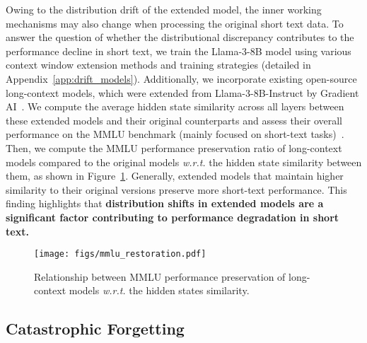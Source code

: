 Owing to the distribution drift of the extended model, the inner working mechanisms may also change when processing the original short text data. 
To answer the question of whether the distributional discrepancy contributes to the performance decline in short text, we train the Llama-3-8B model using various context window extension methods and training strategies (detailed in Appendix~\ref{app:drift_models}). Additionally, we incorporate existing open-source long-context models, which were extended from Llama-3-8B-Instruct by Gradient AI~\cite{gradient-hf-2024-longcontextllama3}. We compute the average hidden state similarity across all layers between these extended models and their original counterparts and assess their overall performance on the MMLU benchmark (mainly focused on short-text tasks)~\cite{Hendrycks-iclr-2021-mmlu}. Then, we compute the MMLU performance preservation ratio of long-context models compared to the original models \emph{w.r.t.} the hidden state similarity between them, as shown in Figure~\ref{fig:mmlu_restoration}. Generally, extended models that maintain higher similarity to their original versions preserve more short-text performance. This finding highlights that \textbf{distribution shifts in extended models are a significant factor contributing to performance degradation in short text.}

%
\begin{figure}[htb]
   \centering
    \texttt{[image: figs/mmlu\_restoration.pdf]}
    \caption{Relationship between MMLU performance preservation of long-context models \emph{w.r.t.} the hidden states similarity.}
    \label{fig:mmlu_restoration}
\end{figure}










\subsection{Catastrophic Forgetting}
\label{sec:forgetting}

